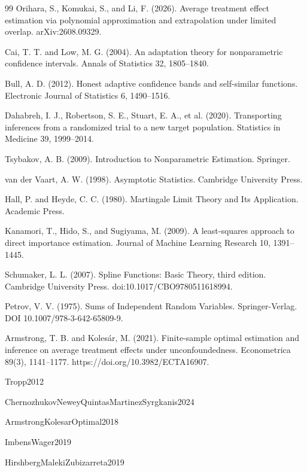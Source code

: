 \documentclass{article}
\begin{document}
\begin{thebibliography}{99}
   Orihara, S., Komukai, S., and Li, F. (2026). Average treatment effect estimation via polynomial approximation and extrapolation under limited overlap. arXiv:2608.09329.

   Cai, T. T. and Low, M. G. (2004). An adaptation theory for nonparametric confidence intervals. Annals of Statistics 32, 1805--1840.

   Bull, A. D. (2012). Honest adaptive confidence bands and self-similar functions. Electronic Journal of Statistics 6, 1490--1516.

   Dahabreh, I. J., Robertson, S. E., Stuart, E. A., et al. (2020). Transporting inferences from a randomized trial to a new target population. Statistics in Medicine 39, 1999--2014.

   Tsybakov, A. B. (2009). Introduction to Nonparametric Estimation. Springer.

   van der Vaart, A. W. (1998). Asymptotic Statistics. Cambridge University Press.

   Hall, P. and Heyde, C. C. (1980). Martingale Limit Theory and Its Application. Academic Press.

   Kanamori, T., Hido, S., and Sugiyama, M. (2009). A least-squares approach to direct importance estimation. Journal of Machine Learning Research 10, 1391--1445.

   Schumaker, L. L. (2007). Spline Functions: Basic Theory, third edition. Cambridge University Press. doi:10.1017/CBO9780511618994.

   Petrov, V. V. (1975). Sums of Independent Random Variables. Springer-Verlag. DOI 10.1007/978-3-642-65809-9.

   Armstrong, T. B. and Kolesár, M. (2021). Finite-sample optimal estimation and inference on average treatment effects under unconfoundedness. Econometrica 89(3), 1141--1177. https://doi.org/10.3982/ECTA16907.

   Tropp2012

   ChernozhukovNeweyQuintasMartinezSyrgkanis2024

   ArmstrongKolesarOptimal2018

   ImbensWager2019

   HirshbergMalekiZubizarreta2019

\end{thebibliography}
\end{document}
